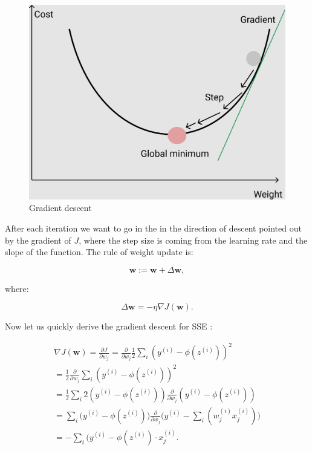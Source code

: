 \documentclass[a4paper,oneside,openright,11pt]{book}
\begin{document}
\begin{figure}[h]
\centering
\includegraphics[scale=0.15]{DocumentFigures/MyFigures/MyGradientDescent.png}
\caption{Gradient descent \cite{gradient}}
\label{GradientPlot}
\end{figure}

After each iteration we want to go in the in the direction of descent pointed out by the gradient of $J$, where the step size is coming from the learning rate and the slope of the function. The rule of weight update is:

\begin{equation}
    \textbf{w} := \textbf{w} + \Delta \textbf{w},
\end{equation}

where:

\begin{equation}
    \Delta \textbf{w} = - \eta \nabla J(\textbf{w}).
\end{equation}

Now let us quickly derive the gradient descent for SSE \cite{raschka}:

\begin{equation}
\begin{aligned}
\nabla J(\textbf{w}) = \frac{\partial J}{\partial w_j} = \frac{\partial }{\partial w_j} \frac{1}{2} \sum_{i}^{}(y^{(i)} - \phi(z^{(i)}))^{2}  \\
       = \frac{1}{2} \frac{\partial }{\partial w_j} \sum_{i}^{}(y^{(i)} - \phi(z^{(i)}))^{2}  \\
      = \frac{1}{2}  \sum_{i}^{}2(y^{(i)} - \phi(z^{(i)}))\frac{\partial }{\partial w_j}(y^{(i)} - \phi(z^{(i)}))  \\
      = \sum_{i}^{}\big(y^{(i)} - \phi(z^{(i)})\big)\frac{\partial}{\partial w_{j}}\Big(y^{(i)} - \sum_{i}^{}(w_{j}^{(i)}x_{j}^{(i)}) \Big)\\
      = - \sum_{i}^{}(y^{(i)} - \phi(z^{(i)}) \cdot x_{j}^{(i)}.  
\end{aligned}
\end{equation}
\end{document}
